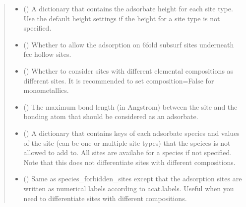 \documentclass[letterpaper,10pt,english]{sphinxmanual}
\begin{document}
\begin{fulllineitems}
\begin{quote}
\begin{description}
\begin{itemize}
\item {} 
 (\sphinxstyleliteralemphasis{\sphinxupquote{, }}) \textendash{} A dictionary that contains the adsorbate height for each site
type. Use the default height settings if the height for a site
type is not specified.

\item {} 
 (\sphinxstyleliteralemphasis{\sphinxupquote{, }}) \textendash{} Whether to allow the adsorption on 6\sphinxhyphen{}fold subsurf sites
underneath fcc hollow sites.

\item {} 
 (\sphinxstyleliteralemphasis{\sphinxupquote{, }}) \textendash{} Whether to consider sites with different elemental
compositions as different sites. It is recommended to
set composition=False for monometallics.

\item {} 
 (\sphinxstyleliteralemphasis{\sphinxupquote{, }}) \textendash{} The maximum bond length (in Angstrom) between the site and the
bonding atom  that should be considered as an adsorbate.

\item {} 
 (\sphinxstyleliteralemphasis{\sphinxupquote{, }}) \textendash{} A dictionary that contains keys of each adsorbate species and
values of the site (can be one or multiple site types) that the
speices is not allowed to add to. All sites are availabe for a
species if not specified. Note that this does not differentiate
sites with different compositions.

\item {} 
 (\sphinxstyleliteralemphasis{\sphinxupquote{, }}) \textendash{} Same as species\_forbidden\_sites except that the adsorption sites
are written as numerical labels according to acat.labels. Useful
when you need to differentiate sites with different compositions.


\end{itemize}
\end{description}
\end{quote}
\end{fulllineitems}
\end{document}
